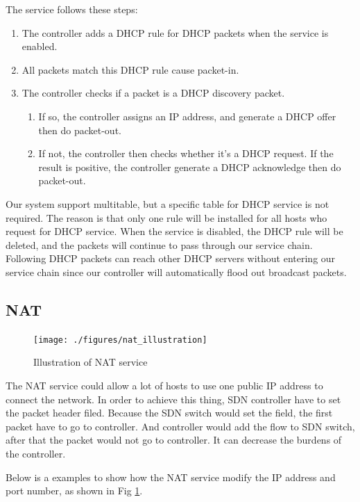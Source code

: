 \documentclass[journal]{IEEEtran}
\begin{document}
The service follows these steps:
\begin{enumerate}
\item The controller adds a DHCP rule for DHCP packets when the service is enabled.
\item All packets match this DHCP rule cause packet-in.
\item The controller checks if a packet is a DHCP discovery packet.
  \begin{enumerate}
    \item If so, the controller assigns an IP address, and generate a DHCP offer then do packet-out.
    \item If not, the controller then checks whether it's a DHCP request. If the result is positive, the controller generate a DHCP acknowledge then do packet-out.
  \end{enumerate}
\end{enumerate}

Our system support multitable, but a specific table for DHCP service is not required.
The reason is that only one rule will be installed for all hosts who request for DHCP service.
When the service is disabled, the DHCP rule will be deleted,
and the packets will continue to pass through our service chain.
Following DHCP packets can reach other DHCP servers without entering our service chain
since our controller will automatically flood out broadcast packets.


\subsection{NAT}
\begin{figure}[!t]
\label{fig:nat_illustration}
\centering
\texttt{[image: ./figures/nat\_illustration]}
\caption{Illustration of NAT service}
\end{figure}
The NAT service could allow a lot of hosts to use one public IP address to connect the network.
In order to achieve this thing, SDN controller have to set the packet header filed.
Because the SDN switch would set the field, the first packet have to go to controller.
And controller would add the flow to SDN switch, after that the packet would not go to controller.
It can decrease the burdens of the controller.

Below is a examples to show how the NAT service modify the IP address and port number,
as shown in Fig \ref{fig:nat_illustration}.
\end{document}
